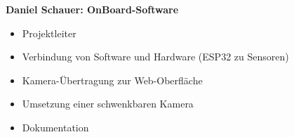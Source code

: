 \documentclass[ngerman,12pt,a4paper]{article}
\begin{document}
\begin{center}
\begin{minipage}{0.18\textwidth}
			\end{minipage}
			\hfill
			\begin{minipage}{0.65\textwidth}
				\vspace{-40pt}
				\textbf{Daniel Schauer: OnBoard-Software}
				\begin{itemize}
					\item Projektleiter \vspace{-10pt}
					\item Verbindung von Software und Hardware (ESP32 zu Sensoren) \vspace{-10pt}
					\item Kamera-Übertragung zur Web-Oberfläche \vspace{-10pt}
					\item Umsetzung einer schwenkbaren Kamera \vspace{-10pt}
					\item Dokumentation \vspace{-10pt}
				\end{itemize}
			\end{minipage} \\[1cm]
		

\end{center}
\end{document}
